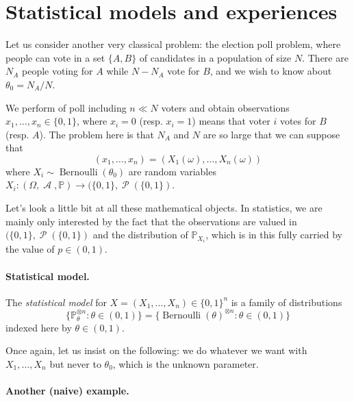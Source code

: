 \documentclass[
	fontsize=11pt, %
	twoside=false, %
	numbers=noenddot, %
]{kaobook}
\DeclareMathOperator{\cA}{\mathcal A}
\DeclareMathOperator{\cP}{\mathcal P}
\DeclareMathOperator{\ber}{Bernoulli}
\renewcommand{\P}{\mathbb P}
\begin{document}
\section{Statistical models and experiences} %
\label{sec:statistical_models_and_experiences}

Let us consider another very classical problem: the election poll problem, where people can vote in a set $\{A, B\}$ of candidates in a population of size $N$.
There are $N_A$ people voting for $A$ while $N - N_A$ vote for $B$, and we wish to know about $\theta_0 = N_A / N$.

We perform of poll including $n \ll N$ voters and obtain observations $x_1, \ldots, x_n \in \{ 0, 1 \}$, where $x_i = 0$ (resp. $x_i = 1$) means that voter $i$ votes for $B$ (resp. $A$).
The problem here is that $N_A$ and $N$ are so large that we can suppose that
\begin{equation*}
	(x_1, \ldots, x_n) = (X_1(\omega), \ldots, X_n(\omega))
\end{equation*}
where $X_i \sim \ber(\theta_0)$ are random variables $X_i : (\Omega, \cA, \P) \rightarrow (\{0, 1\}, \cP(\{ 0, 1\})$.

Let's look a little bit at all these mathematical objects. 
In statistics, we are mainly only interested by the fact that the observations are valued in $(\{0, 1\}, \cP(\{ 0, 1\})$ and the distribution of $\P_{X_i}$, which is in this fully carried by the value of $p \in (0, 1)$.
\todo{dire qu'on s'en fout de $\Omega, \cA, \P$ etc.}

\paragraph{Statistical model.}

The \emph{statistical model} for $X = (X_1, \ldots, X_n) \in \{0, 1\}^n$ is a family of distributions
\begin{equation}
	\{ \P_\theta^{\otimes n} : \theta \in (0, 1) \}	= \{ \ber(\theta)^{\otimes n} : \theta \in (0, 1) \}
\end{equation}
indexed here by $\theta \in (0, 1)$.

Once again, let us insist on the following: we do whatever we want with $X_1, \ldots, X_n$ but never to $\theta_0$, which is the unknown parameter.


\paragraph{Another (naive) example.}
\end{document}
